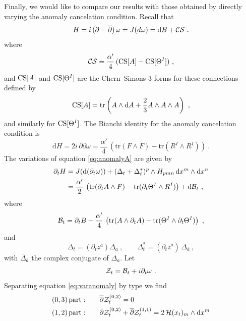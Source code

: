 \documentclass[12pt,a4paper]{article}
\def\bar#1{\overline{#1}}
\let\p=\partial
\def\d{\textrm{d}}
\def\bp{\bar{\partial}}
\def\tr{\textrm{tr}}
\theoremstyle{definition}
\begin{document}
Finally, we would like to compare our results with those obtained by directly varying the anomaly cancelation condition.  Recall that
\begin{equation}
H =  i\, (\p- \bp)\, \omega = J(d\omega) = \d B + {\cal C S}~.\label{eq:anomalyA}
\end{equation}
where  
\[ {\cal C S} = \frac{\alpha'}{4}\, ({\rm CS}[A] - {\rm CS}[\Theta^I])~,\]
and ${\rm CS}[A]$ and ${\rm CS}[\Theta^I]$ are the Chern--Simons 3-forms for these connections defined by
\begin{equation*} 
{\rm CS}[A] = \tr\left(A\wedge\d A + \frac{2}{3} A\wedge A\wedge A\right)~, 
\end{equation*}
and similarly for ${\rm CS}[\Theta^I]$.  The Bianchi identity for the anomaly cancelation condition is 
\begin{equation*}
\d H = 2 i\, \bp \p \omega = \frac{\alpha'}{4}\,\left(\tr (F\wedge F) - \tr (R^I\wedge R^I) \right)~.
\end{equation*}
The variations of equation \eqref{eq:anomalyA} are given by~\citep{Anderson:2014xha, Candelas2014}
\begin{equation}
\begin{split}
\p_t H &= J(\d(\p_t\omega)) + (\Delta_t + \Delta^*_t)^p\wedge H_{pmn}\, \d x^m\wedge\d x^n\\
&= \frac{\alpha'}{2}\, \left(\tr (\p_t A\wedge F) - \tr(\p_t\Theta^I\wedge R^I)\right) + \d {\cal B}_t~,\label{eq:varanomaly}
\end{split}
\end{equation}
where
\begin{equation}
{\cal B}_t = \p_t B - \frac{\alpha'}{4}\, \left(\tr (A\wedge \p_t A) - \tr(\Theta^I\wedge\p_t\Theta^I)\right)~,\label{eq:varB}
\end{equation}
and
\[ \Delta_t = (\p_t z^a) \Delta_a~,\qquad \Delta^*_t = (\p_t \bar z^{\bar a})\, \bar\Delta_{\bar a}~,\]
with $\bar\Delta_{\bar a}$ the complex conjugate of $\Delta_a$.
Let
\begin{equation}
{\cal Z}_t = {\cal B}_t + i \p_t\omega~.\label{eq:complexherm}
\end{equation}
Separating equation \eqref{eq:varanomaly} by type we find
\begin{equation}
\begin{split}
(0,3)\, {\rm part:}\qquad &\bp{\cal Z}_t^{(0,2)} = 0\\
(1,2)\, {\rm part:}\qquad &\p{\cal Z}_t^{(0,2)} +  \bp{\cal Z}_t^{(1,1)}  = 2\, {\cal H}(x_t)_m\wedge\d x^m
\label{eq:eqsforZ}
\end{split}
\end{equation}
\end{document}
